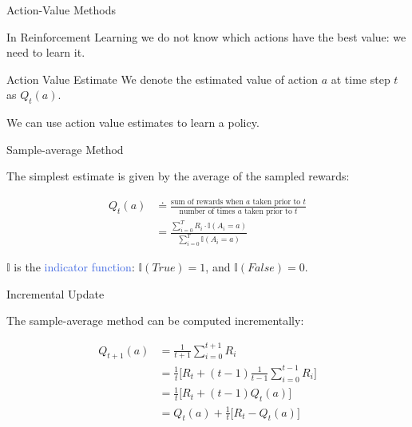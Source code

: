 \documentclass{beamer}
\begin{document}
\begin{frame}{Action-Value Methods}

In Reinforcement Learning we do not know which actions have the best value: we need to learn it.

\vspace{2mm}

\begin{block}{Action Value Estimate}		
We denote the estimated value of action $a$ at time step $t$ as $Q_t(a)$.
\end{block}

\vspace{2mm}

We can use action value estimates to learn a policy.

\end{frame}

\begin{frame}{Sample-average Method}

The simplest estimate is given by the average of the sampled rewards:

\begin{align*}
	Q_t(a) &\doteq \frac{\text{sum of rewards when $a$ taken prior to $t$}}{\text{number of times $a$ taken prior to $t$} }\\
	   & = \frac{\sum_{i=0}^{T} R_i \cdot \mathds I(A_i = a)}{\sum_{i=0}^{T} \mathds I(A_i = a)}
\end{align*}

$\mathds I$ is the \textcolor{RoyalBlue}{indicator function}: $\mathds I(True) = 1$, and $\mathds I(False) = 0$.
 
\end{frame}


\begin{frame}{Incremental Update}

The sample-average method can be computed incrementally:

\begin{align*}
	Q_{t+1}(a) &= \frac{1}{t+1} \sum_{i=0}^{t+1} R_i \\
	           &= \frac{1}{t} \bigg[ R_t + (t-1)\frac{1}{t-1}\sum_{i=0}^{t-1} R_i \bigg]\\
	           &= \frac{1}{t} \bigg[ R_t + (t-1) Q_t(a) \bigg ]\\
	           &= Q_t(a) + \frac{1}{t}  \bigg[ R_t - Q_t(a)  \bigg ]
\end{align*}


\end{frame}
\end{document}

